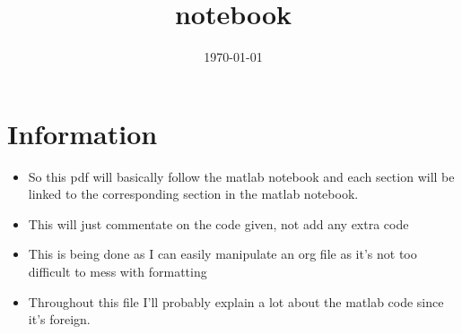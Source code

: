 \documentclass{article}
\date{\today}
\title{notebook}
\begin{document}
\maketitle
\tableofcontents

\section{Information}
\label{sec-1}
\begin{itemize}
\item So this pdf will basically follow the matlab notebook and each section
will be linked to the corresponding section in the matlab notebook.
\item This will just commentate on the code given, not add any extra code
\item This is being done as I can easily manipulate an org file as
it's not too difficult to mess with formatting
\item Throughout this file I'll probably explain a lot about the matlab
code since it's foreign.
\end{itemize}
\end{document}
